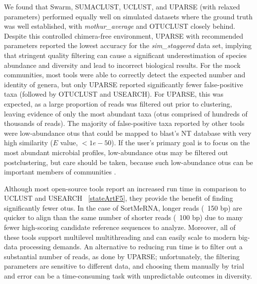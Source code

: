 We found that Swarm, SUMACLUST, UCLUST, and UPARSE (with relaxed parameters)
performed equally well on simulated datasets where the ground truth was well
established, with \emph{mothur\_average} and OTUCLUST closely behind. Despite
this controlled chimera-free environment, UPARSE with recommended parameters
reported the lowest accuracy for the \emph{sim\_staggered} data set, implying
that stringent quality filtering can cause a significant underestimation of
species abundance and diversity and lead to incorrect biological results. For
the mock communities, most tools were able to correctly detect the expected
number and identity of genera, but only UPARSE reported significantly fewer
false-positive taxa (followed by OTUCLUST and USEARCH). For UPARSE, this was
expected, as a large proportion of reads was filtered out prior to clustering,
leaving evidence of only the most abundant taxa (\gls{otu}s comprised of
hundreds of thousands of reads). The majority of false-positive taxa reported
by other tools were low-abundance \gls{otu}s that could be mapped to \gls{blast}’s NT
database with very high similarity ($E$ value, $<1e−50$). If the user’s primary
goal is to focus on the most abundant microbial profiles, low-abundance \gls{otu}s
may be filtered out postclustering, but care should be taken, because such low-abundance
\gls{otu}s can be important members of communities \cite{Shade2014}.

Although most open-source tools report an increased run time in comparison to UCLUST
and USEARCH ~\ref{stateArtF5}, they provide the benefit of finding significantly
fewer \gls{otu}s. In the case of SortMeRNA, longer reads (~150 \gls{bp}) are quicker
to align than the same number of shorter reads (~100 \gls{bp}) due to many fewer
high-scoring candidate reference sequences to analyze. Moreover, all of these tools
support multilevel multithreading and can easily scale to modern big-data processing
demands. An alternative to reducing run time is to filter out a substantial
number of reads, as done by UPARSE; unfortunately, the filtering parameters are
sensitive to different data, and choosing them manually by trial and error can be
a time-consuming task with unpredictable outcomes in diversity.

